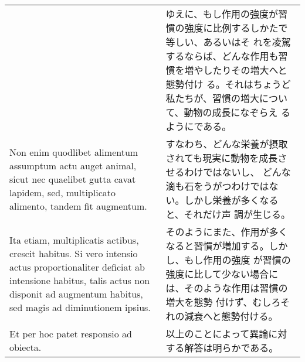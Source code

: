 \documentclass[10pt]{jsarticle} %
\begin{document}
\begin{longtable}{p{21em}p{21em}}
&

ゆえに、もし作用の強度が習慣の強度に比例するしかたで等しい、あるいはそ
 れを凌駕するならば、どんな作用も習慣を増やしたりその増大へと態勢付け
 る。それはちょうど私たちが、習慣の増大について、動物の成長になぞらえ
 るようにである。

\\

Non enim quodlibet alimentum assumptum actu auget
animal, sicut nec quaelibet gutta cavat lapidem, sed, multiplicato
alimento, tandem fit augmentum. 


&

すなわち、どんな栄養が摂取されても現実に動物を成長させるわけではないし、
 どんな滴も石をうがつわけではない。しかし栄養が多くなると、それだけ声
 調が生じる。

\\


Ita etiam, multiplicatis actibus,
crescit habitus. Si vero intensio actus proportionaliter deficiat ab
intensione habitus, talis actus non disponit ad augmentum habitus, sed
magis ad diminutionem ipsius.

&

そのようにまた、作用が多くなると習慣が増加する。しかし、もし作用の強度
が習慣の強度に比して少ない場合には、そのような作用は習慣の増大を態勢
付けず、むしろそれの減衰へと態勢付ける。

\\



Et per hoc patet responsio ad obiecta.

&

以上のことによって異論に対する解答は明らかである。

\end{longtable}
\end{document}
